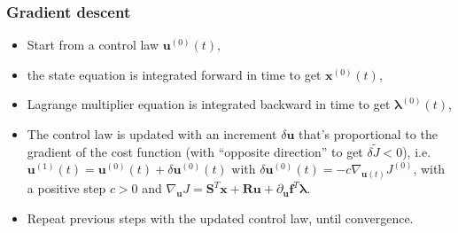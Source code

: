 \documentclass[letterpaper,10pt,english]{jupyterBook}
\begin{document}
\subsubsection*{Gradient descent}
\begin{itemize}
\item {} 
\sphinxAtStartPar
Start from a control law \(\mathbf{u}^{(0)}(t)\),

\item {} 
\sphinxAtStartPar
the state equation is integrated forward in time to get \(\mathbf{x}^{(0)}(t)\),

\item {} 
\sphinxAtStartPar
Lagrange multiplier equation is integrated backward in time to get \(\boldsymbol\lambda^{(0)}(t)\),

\item {} 
\sphinxAtStartPar
The control law is updated with an increment \(\delta \mathbf{u}\) that’s proportional to the gradient of the cost function (with “opposite direction” to get \(\delta \widetilde{J} < 0\)), i.e. \(\mathbf{u}^{(1)}(t) = \mathbf{u}^{(0)}(t) + \delta \mathbf{u}^{(0)}(t)\) with \(\delta \mathbf{u}^{(0)}(t) = - c \nabla_{\mathbf{u}(t)} J^{(0)}\), with a positive step \(c > 0\) and \(\nabla_{\mathbf{u}} J = \mathbf{S}^T \mathbf{x} + \mathbf{R} \mathbf{u} + \partial_{\mathbf{u}} \mathbf{f}^T \boldsymbol\lambda\).

\item {} 
\sphinxAtStartPar
Repeat previous steps with the updated control law, until convergence.

\end{itemize}
\end{document}
